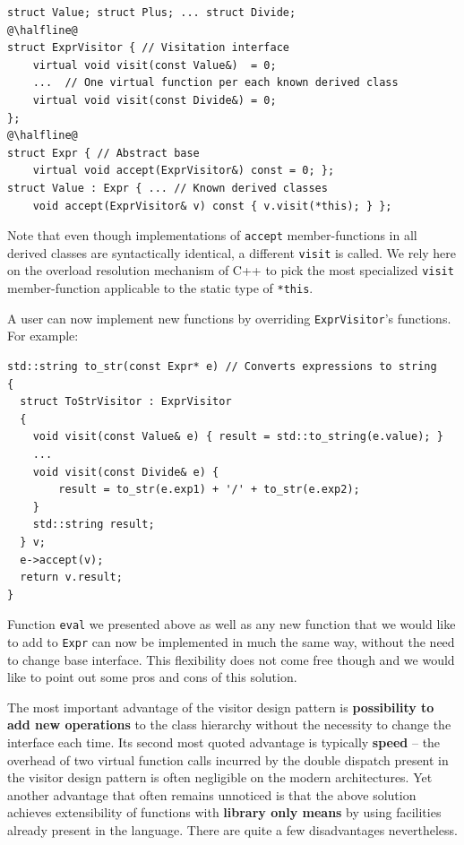 \documentclass[preprint]{sigplanconf}
\makeatletter
\DeclareRobustCommand{\code}[1]{{\lstinline[breaklines=false,escapechar=@]{#1}}}
\makeatother
\begin{document}
\begin{lstlisting}
struct Value; struct Plus; ... struct Divide;
@\halfline@
struct ExprVisitor { // Visitation interface
    virtual void visit(const Value&)  = 0;
    ...  // One virtual function per each known derived class
    virtual void visit(const Divide&) = 0;
};
@\halfline@
struct Expr { // Abstract base
    virtual void accept(ExprVisitor&) const = 0; };
struct Value : Expr { ... // Known derived classes
    void accept(ExprVisitor& v) const { v.visit(*this); } };
\end{lstlisting}

\noindent
Note that even though implementations of \code{accept} member-functions in all 
derived classes are syntactically identical, a different \code{visit} is called. 
We rely here on the overload resolution mechanism of C++ to pick the most 
specialized \code{visit} member-function applicable to the static type of 
\code{*this}.


A user can now implement new functions by overriding \code{ExprVisitor}'s 
functions. For example:

\begin{lstlisting}
std::string to_str(const Expr* e) // Converts expressions to string
{
  struct ToStrVisitor : ExprVisitor
  {
    void visit(const Value& e) { result = std::to_string(e.value); }
    ...
    void visit(const Divide& e) { 
        result = to_str(e.exp1) + '/' + to_str(e.exp2); 
    }
    std::string result;
  } v;
  e->accept(v);
  return v.result;
}
\end{lstlisting}

\noindent
Function \code{eval} we presented above as well as any new function that we 
would like to add to \code{Expr} can now be implemented in much the same way, 
without the need to change base interface. This flexibility does not come free 
though and we would like to point out some pros and cons of this solution.

The most important advantage of the visitor design pattern is {\bf possibility 
to add new operations} to the class hierarchy without the necessity to change 
the interface each time. Its second most quoted advantage is typically {\bf 
speed} -- the overhead of two virtual function calls incurred by the double 
dispatch present in the visitor design pattern is often negligible on the modern 
architectures. Yet another advantage that often remains unnoticed is that the 
above solution achieves extensibility of functions with {\bf library only means} 
by using facilities already present in the language. There are quite a few 
disadvantages nevertheless.
\end{document}
